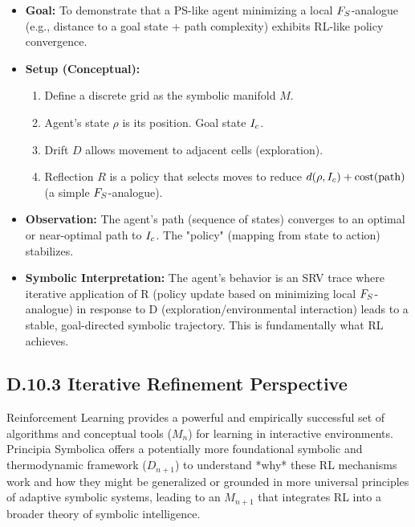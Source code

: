 \begin{itemize}
    \item \textbf{Goal:} To demonstrate that a PS-like agent minimizing a local \(F_S\)-analogue (e.g., distance to a goal state + path complexity) exhibits RL-like policy convergence.
    \item \textbf{Setup (Conceptual):}
        \begin{enumerate}
            \item Define a discrete grid as the symbolic manifold \(M\).
            \item Agent's state \(\rho\) is its position. Goal state \(I_c\).
            \item Drift \(D\) allows movement to adjacent cells (exploration).
            \item Reflection \(R\) is a policy that selects moves to reduce \(d(\rho, I_c) + \text{cost}(\text{path})\) (a simple \(F_S\)-analogue).
        \end{enumerate}
    \item \textbf{Observation:} The agent's path (sequence of states) converges to an optimal or near-optimal path to \(I_c\). The "policy" (mapping from state to action) stabilizes.
    \item \textbf{Symbolic Interpretation:} The agent's behavior is an SRV trace where iterative application of R (policy update based on minimizing local \(F_S\)-analogue) in response to D (exploration/environmental interaction) leads to a stable, goal-directed symbolic trajectory. This is fundamentally what RL achieves.
\end{itemize}
\subsection*{D.10.3 Iterative Refinement Perspective}
\label{subsec:appD_rl_iterative_refinement_perspective}
Reinforcement Learning provides a powerful and empirically successful set of algorithms and conceptual tools (\(M_n\)) for learning in interactive environments. Principia Symbolica offers a potentially more foundational symbolic and thermodynamic framework (\(D_{n+1}\)) to understand *why* these RL mechanisms work and how they might be generalized or grounded in more universal principles of adaptive symbolic systems, leading to an \(M_{n+1}\) that integrates RL into a broader theory of symbolic intelligence.
